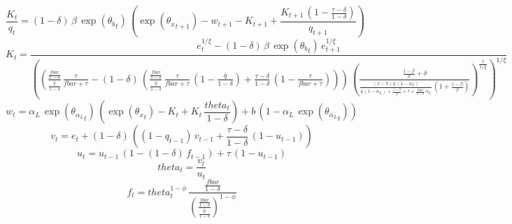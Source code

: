 \begin{dmath}
\frac{{{K}}_{t}}{{{q}}_{t}}=\left(1-{{\delta}}\right)\, {{\beta}}\, \exp\left({{\theta_b}}_{t}\right)\, \left(\exp\left({{\theta_x}}_{t+1}\right)-{{w}}_{t+1}-{{K}}_{t+1}+\frac{{{K}}_{t+1}\, \left(1-\frac{{{\tau}}-{{\delta}}}{1-{{\delta}}}\right)}{{{q}}_{t+1}}\right)
\end{dmath}
\begin{dmath}
{{K}}_{t}=\frac{{{e}}_{t}^{{{1/\xi}}}-\left(1-{{\delta}}\right)\, {{\beta}}\, \exp\left({{\theta_b}}_{t}\right)\, {{e}}_{t+1}^{{{1/\xi}}}}{\left(\left(\frac{\frac{{fbar}}{1-{{\delta}}}}{\frac{{{\overline{q}}}}{1-{{\delta}}}}\, \frac{{{\tau}}}{{fbar}+{{\tau}}}-\left(1-{{\delta}}\right)\, \left(\frac{\frac{{fbar}}{1-{{\delta}}}}{\frac{{{\overline{q}}}}{1-{{\delta}}}}\, \frac{{{\tau}}}{{fbar}+{{\tau}}}\, \left(1-\frac{{{\overline{q}}}}{1-{{\delta}}}\right)+\frac{{{\tau}}-{{\delta}}}{1-{{\delta}}}\, \left(1-\frac{{{\tau}}}{{fbar}+{{\tau}}}\right)\right)\right)\, \left(\frac{\frac{1-{{\beta}}}{{{\beta}}}+{{\delta}}}{\frac{\left({{x}}-{b}\right)\, {{\overline{q}}}\, \left(1-{\alpha_L}\right)}{{{\overline{q}}}\, \left(1-{\alpha_L}\right)+\frac{1-{{\beta}}}{{{\beta}}}+{{\tau}}+\frac{{fbar}}{1-{{\delta}}}\, {\alpha_L}}\, \left(1+\frac{1-{{\beta}}}{{{\beta}}}\right)}\right)^{\frac{1}{{{1/\xi}}}}\right)^{{{1/\xi}}}}
\end{dmath}
\begin{dmath}
{{w}}_{t}={\alpha_L}\, \exp\left({{\theta_{\alpha_L}}}_{t}\right)\, \left(\exp\left({{\theta_x}}_{t}\right)-{{K}}_{t}+{{K}}_{t}\, \frac{{{theta}}_{t}}{1-{{\delta}}}\right)+{b}\, \left(1-{\alpha_L}\, \exp\left({{\theta_{\alpha_L}}}_{t}\right)\right)
\end{dmath}
\begin{dmath}
{{v}}_{t}={{e}}_{t}+\left(1-{{\delta}}\right)\, \left(\left(1-{{q}}_{t-1}\right)\, {{v}}_{t-1}+\frac{{{\tau}}-{{\delta}}}{1-{{\delta}}}\, \left(1-{{u}}_{t-1}\right)\right)
\end{dmath}
\begin{dmath}
{{u}}_{t}={{u}}_{t-1}\, \left(1-\left(1-{{\delta}}\right)\, {{f}}_{t-1}\right)+{{\tau}}\, \left(1-{{u}}_{t-1}\right)
\end{dmath}
\begin{dmath}
{{theta}}_{t}=\frac{{{v}}_{t}}{{{u}}_{t}}
\end{dmath}
\begin{dmath}
{{f}}_{t}={{theta}}_{t}^{1-{\phi}}\, \frac{\frac{{fbar}}{1-{{\delta}}}}{\left(\frac{\frac{{fbar}}{1-{{\delta}}}}{\frac{{{\overline{q}}}}{1-{{\delta}}}}\right)^{1-{\phi}}}
\end{dmath}
